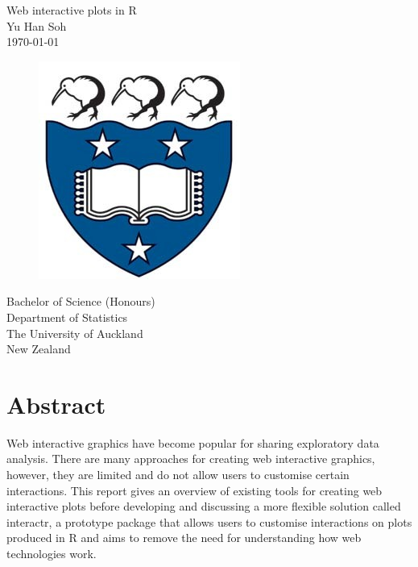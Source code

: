 \documentclass[11pt,]{report}
\title{}
\author{}
\date{}
\begin{document}

\begin{centering}
\vspace*{\fill}
\Huge{Web interactive plots in R} \\
\vspace{2cm}
\Large{Yu Han Soh} \\
\vspace{1cm}
\today \\
\vspace{3cm}

\begin{figure}[H]

{\centering \includegraphics[width=0.3\linewidth,]{./figures/logo} 

}

\end{figure}

\vspace{1cm}
  Bachelor of Science (Honours)\\
  Department of Statistics\\
  The University of Auckland\\
  New Zealand
\vspace*{\fill}

\end{centering}

\newpage


\chapter*{Abstract}\label{abstract}

Web interactive graphics have become popular for sharing exploratory
data analysis. There are many approaches for creating web interactive
graphics, however, they are limited and do not allow users to customise
certain interactions. This report gives an overview of existing tools
for creating web interactive plots before developing and discussing a
more flexible solution called \textsf{interactr}, a prototype package
that allows users to customise interactions on plots produced in R and
aims to remove the need for understanding how web technologies work.
\end{document}
